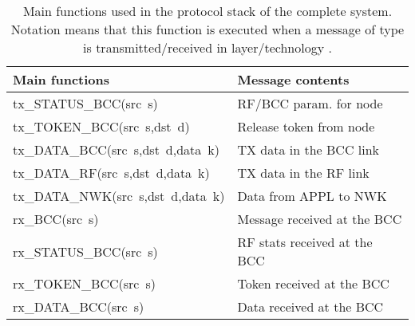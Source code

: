 \documentclass[10pt]{IEEEtran}
\begin{document}
\begin{table}[!t]
\caption{Main functions used in the protocol stack of the complete system. Notation  means that this function is executed when a message of type  is transmitted/received in layer/technology . }
\label{tab1}
\begin{tabular}{|l|l|}
\hline
Main functions & Message contents\\
\hline
tx\_STATUS\_BCC(src~s) & RF/BCC param. for node \\
tx\_TOKEN\_BCC(src~s,dst~d) &  Release token from node \\
tx\_DATA\_BCC(src~s,dst~d,data~k) & TX data in the BCC link \\
tx\_DATA\_RF(src~s,dst~d,data~k) & TX data in the RF link \\
tx\_DATA\_NWK(src~s,dst~d,data~k) & Data from APPL to NWK \\
rx\_BCC(src~s) & Message received at the BCC\\
rx\_STATUS\_BCC(src~s) & RF stats received at the BCC\\
rx\_TOKEN\_BCC(src~s) & Token received at the BCC\\
rx\_DATA\_BCC(src~s) & Data received at the BCC\\
\hline
\end{tabular}
\end{table}
\end{document}
